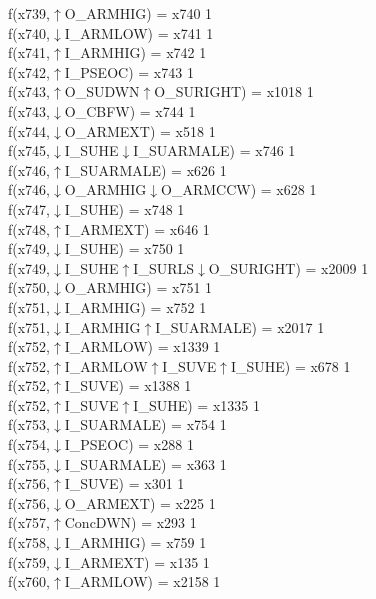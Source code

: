 f(x739,$\uparrow$O\_ARMHIG) = x740 {1} \\
f(x740,$\downarrow$I\_ARMLOW) = x741 {1} \\
f(x741,$\uparrow$I\_ARMHIG) = x742 {1} \\
f(x742,$\uparrow$I\_PSEOC) = x743 {1} \\
f(x743,$\uparrow$O\_SUDWN$\uparrow$O\_SURIGHT) = x1018 {1} \\
f(x743,$\downarrow$O\_CBFW) = x744 {1} \\
f(x744,$\downarrow$O\_ARMEXT) = x518 {1} \\
f(x745,$\downarrow$I\_SUHE$\downarrow$I\_SUARMALE) = x746 {1} \\
f(x746,$\uparrow$I\_SUARMALE) = x626 {1} \\
f(x746,$\downarrow$O\_ARMHIG$\downarrow$O\_ARMCCW) = x628 {1} \\
f(x747,$\downarrow$I\_SUHE) = x748 {1} \\
f(x748,$\uparrow$I\_ARMEXT) = x646 {1} \\
f(x749,$\downarrow$I\_SUHE) = x750 {1} \\
f(x749,$\downarrow$I\_SUHE$\uparrow$I\_SURLS$\downarrow$O\_SURIGHT) = x2009 {1} \\
f(x750,$\downarrow$O\_ARMHIG) = x751 {1} \\
f(x751,$\downarrow$I\_ARMHIG) = x752 {1} \\
f(x751,$\downarrow$I\_ARMHIG$\uparrow$I\_SUARMALE) = x2017 {1} \\
f(x752,$\uparrow$I\_ARMLOW) = x1339 {1} \\
f(x752,$\uparrow$I\_ARMLOW$\uparrow$I\_SUVE$\uparrow$I\_SUHE) = x678 {1} \\
f(x752,$\uparrow$I\_SUVE) = x1388 {1} \\
f(x752,$\uparrow$I\_SUVE$\uparrow$I\_SUHE) = x1335 {1} \\
f(x753,$\downarrow$I\_SUARMALE) = x754 {1} \\
f(x754,$\downarrow$I\_PSEOC) = x288 {1} \\
f(x755,$\downarrow$I\_SUARMALE) = x363 {1} \\
f(x756,$\uparrow$I\_SUVE) = x301 {1} \\
f(x756,$\downarrow$O\_ARMEXT) = x225 {1} \\
f(x757,$\uparrow$ConcDWN) = x293 {1} \\
f(x758,$\downarrow$I\_ARMHIG) = x759 {1} \\
f(x759,$\downarrow$I\_ARMEXT) = x135 {1} \\
f(x760,$\uparrow$I\_ARMLOW) = x2158 {1} \\
